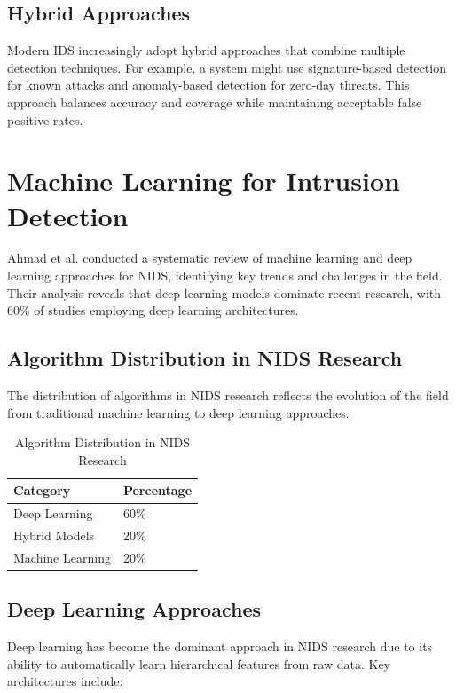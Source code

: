 \documentclass[12pt,a4paper]{report}
\begin{document}
\subsection{Hybrid Approaches}

Modern IDS increasingly adopt hybrid approaches that combine multiple detection techniques. For example, a system might use signature-based detection for known attacks and anomaly-based detection for zero-day threats. This approach balances accuracy and coverage while maintaining acceptable false positive rates.

\section{Machine Learning for Intrusion Detection}

Ahmad et al. conducted a systematic review of machine learning and deep learning approaches for NIDS, identifying key trends and challenges in the field. Their analysis reveals that deep learning models dominate recent research, with 60\% of studies employing deep learning architectures.

\subsection{Algorithm Distribution in NIDS Research}

The distribution of algorithms in NIDS research reflects the evolution of the field from traditional machine learning to deep learning approaches.

\begin{table}[htbp]
\centering
\caption{Algorithm Distribution in NIDS Research}
\label{tab:algorithm_distribution}
\renewcommand{\arraystretch}{1.3}
\begin{tabularx}{\textwidth}{|p{4.5cm}|p{4.5cm}|}
\hline
\textbf{Category} & \textbf{Percentage} \\
\hline
Deep Learning & 60\% \\
\hline
Hybrid Models & 20\% \\
\hline
Machine Learning & 20\% \\
\hline
\end{tabularx}
\end{table}

\subsection{Deep Learning Approaches}

Deep learning has become the dominant approach in NIDS research due to its ability to automatically learn hierarchical features from raw data. Key architectures include:
\end{document}
